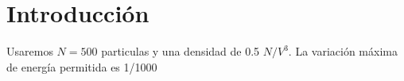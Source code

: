 
\chapter*{Introducción}

Usaremos $N=500$ particulas y una densidad de 0.5 $N/V^3$. La variación máxima de energía permitida es 1/1000